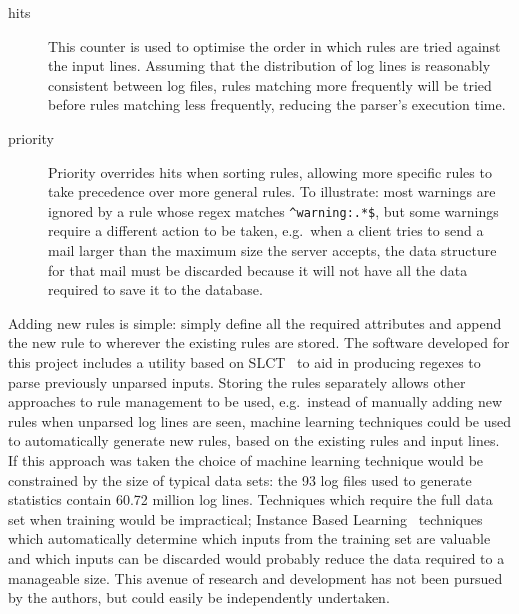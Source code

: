 \documentclass[draft]{svmult}
\newcommand{\numberOFlogFILES}[0]{%
    93%
}
\newcommand{\numberOFlogLINEShuman}[0]{%
    60.72 million%
}
\begin{document}
\begin{description}
    \item [hits] This counter is used to optimise the order in which rules
        are tried against the input lines.  Assuming that the distribution
        of log lines is reasonably consistent between log files, rules
        matching more frequently will be tried before rules matching less
        frequently, reducing the parser's execution time.

    \item [priority] Priority overrides hits when sorting rules, allowing
        more specific rules to take precedence over more general rules.  To
        illustrate: most warnings are ignored by a rule whose regex matches
        \verb!^warning:.*$!, but some warnings require a different action
        to be taken, e.g.\ when a client tries to send a mail larger than
        the maximum size the server accepts, the data structure for that
        mail must be discarded because it will not have all the data
        required to save it to the database.

\end{description}

Adding new rules is simple: simply define all the required attributes and
append the new rule to wherever the existing rules are stored.  The
software developed for this project includes a utility based on
SLCT~\cite{slct-paper} to aid in producing regexes to parse previously
unparsed inputs.  Storing the rules separately allows other approaches to
rule management to be used, e.g.\ instead of manually adding new rules when
unparsed log lines are seen, machine learning techniques could be used to
automatically generate new rules, based on the existing rules and input
lines.  If this approach was taken the choice of machine learning technique
would be constrained by the size of typical data sets: the
\numberOFlogFILES{} log files used to generate statistics contain
\numberOFlogLINEShuman{} log lines.  Techniques which require the full data
set when training would be impractical; Instance Based
Learning~\cite{instance-based-learning} techniques which automatically
determine which inputs from the training set are valuable and which inputs
can be discarded would probably reduce the data required to a manageable
size.  This avenue of research and development has not been pursued by the
authors, but could easily be independently undertaken.

\label{overlapping rules}
\end{document}
